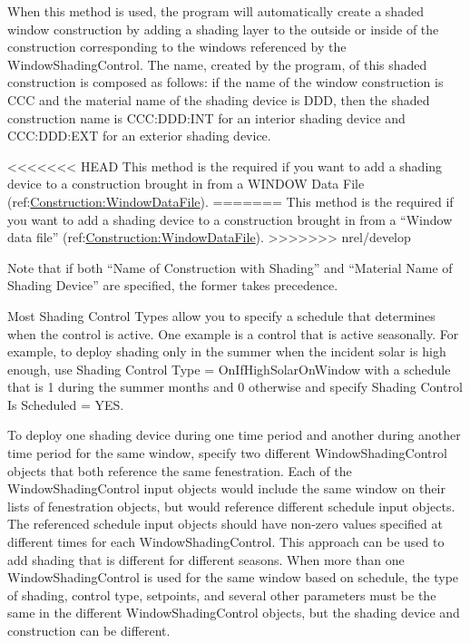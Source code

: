 \begin{itemize}
When this method is used, the program will automatically create a shaded window construction by adding a shading layer to the outside or inside of the construction corresponding to the windows referenced by the WindowShadingControl. The name, created by the program, of this shaded construction is composed as follows: if the name of the window construction is CCC and the material name of the shading device is DDD, then the shaded construction name is CCC:DDD:INT for an interior shading device and CCC:DDD:EXT for an exterior shading device.

<<<<<<< HEAD
This method is the required if you want to add a shading device to a construction brought in from a WINDOW Data File (ref:\hyperref[constructionwindowdatafile]{Construction:WindowDataFile}).
=======
This method is the required if you want to add a shading device to a construction brought in from a ``Window data file'' (ref:\hyperref[constructionwindowdatafile]{Construction:WindowDataFile}).
>>>>>>> nrel/develop

Note that if both ``Name of Construction with Shading'' and ``Material Name of Shading Device'' are specified, the former takes precedence.
\end{itemize}

Most Shading Control Types allow you to specify a schedule that determines when the control is active. One example is a control that is active seasonally. For example, to deploy shading only in the summer when the incident solar is high enough, use Shading Control Type = OnIfHighSolarOnWindow with a schedule that is 1 during the summer months and 0 otherwise and specify Shading Control Is Scheduled = YES.

To deploy one shading device during one time period and another during another time period for the same window, specify two different WindowShadingControl objects that both reference the same fenestration.  Each of the WindowShadingControl input objects would include the same window on their lists of fenestration objects, but would reference different schedule input objects. The referenced schedule input objects should have non-zero values specified at different times for each WindowShadingControl. This approach can be used to add shading that is different for different seasons. When more than one WindowShadingControl is used for the same window based on schedule, the type of shading, control type, setpoints, and several other parameters must be the same in the different WindowShadingControl objects, but the shading device and construction can be different.


